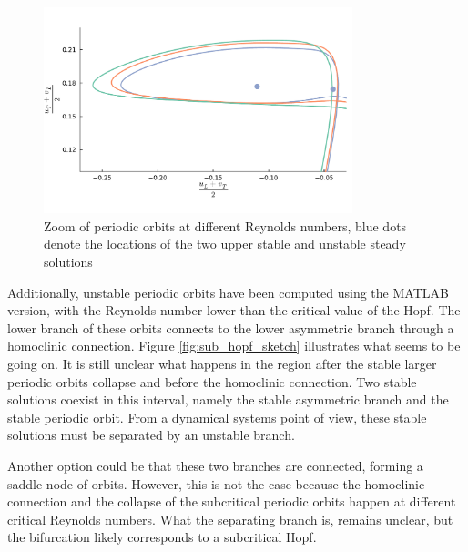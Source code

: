 \begin{figure}[!h]
  \centering
  \includegraphics[trim={0 1cm 0 1cm},clip,width=0.8\textwidth]{figs/orbits_zoom64x64.pdf}
  \caption{Zoom of periodic orbits at different Reynolds numbers, blue dots denote
  the locations of the two upper stable and unstable steady solutions}
  \label{fig:orbits_zoom}
\end{figure}

Additionally, unstable periodic orbits have been computed using the MATLAB
version, with the Reynolds number lower than the critical value of the Hopf.
The lower branch of these orbits connects to the lower asymmetric branch
through a homoclinic connection. Figure \ref{fig:sub_hopf_sketch} illustrates
what seems to be going on. It is still unclear what happens in the region after
the stable larger periodic orbits collapse and before the homoclinic
connection. Two stable solutions coexist in this interval, namely the stable
asymmetric branch and the stable periodic orbit. From a dynamical systems point
of view, these stable solutions must be separated by an unstable branch. 

Another option could be that these two branches are connected, forming a
saddle-node of orbits. However, this is not the case because the homoclinic
connection and the collapse of the subcritical periodic orbits happen at
different critical Reynolds numbers. What the separating branch is, remains
unclear, but the bifurcation likely corresponds to a subcritical Hopf.

